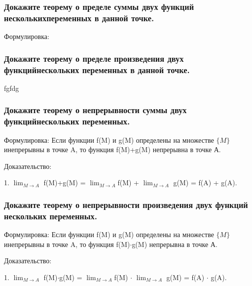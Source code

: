 \documentclass[a4paper, 12pt]{article}
\def\newline{}%
\begin{document}
            \subsubsection{Докажите теорему о пределе суммы двух функций нескольких\newline переменных в данной точке.}

            Формулировка:



            \subsubsection{Докажите теорему о пределе произведения двух функций\newline нескольких переменных в данной точке.}

            fgfdg

            \subsubsection{Докажите теорему о непрерывности суммы двух функций\newline нескольких переменных.}

            Формулировка:
            Если функции f(M) и g(M) определены на множестве $\{M\}$ и\newline непрерывны
            в точке A, то функция f(M)+g(M) непрерывна в точке А.

            Доказательство:

            1. $\displaystyle{\lim_{M \rightarrow A}}$ f(M)+g(M) =
            $\displaystyle{\lim_{M \rightarrow A}}$f(M) + $\displaystyle{\lim_{M \rightarrow A}}$
            g(M) = f(A) + g(A).

            \subsubsection{Докажите теорему о непрерывности произведения двух функций нескольких переменных.}

            Формулировка:
            Если функции f(M) и g(M) определены на множестве $\{M\}$ и\newline непрерывны
            в точке A, то функция f(M)$\cdot$g(M) непрерывна в точке А.

            Доказательство:

            1. $\displaystyle{\lim_{M \rightarrow A}}$ f(M)$\cdot$g(M) =
            $\displaystyle{\lim_{M \rightarrow A}}$f(M) $\cdot$ $\displaystyle{\lim_{M \rightarrow A}}$
            g(M) = f(A) $\cdot$ g(A).
\end{document}
